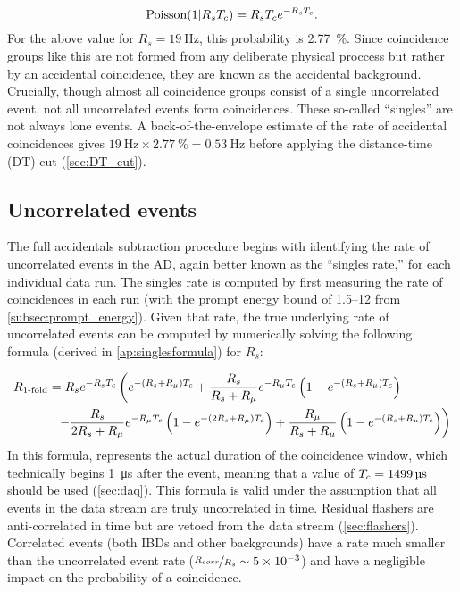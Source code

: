 \begin{equation}
    \text{Poisson}(1\vert R_sT_c) = R_sT_c e^{-R_sT_c}.
\end{equation}
For the above value for $R_s=\SI{19}{\hertz}$, this probability is \SI{2.77}{\percent}.
Since  coincidence groups like this are not formed from any
deliberate physical proccess but rather by an accidental coincidence,
they are known as the accidental background.
Crucially, though almost all  coincidence groups
consist of a single uncorrelated event,
not all uncorrelated events form  coincidences.
These so-called ``singles'' are not always lone events.
A back-of-the-envelope estimate of the rate of accidental coincidences gives
$\SI{19}{\hertz}\times\SI{2.77}{\percent}=\SI{0.53}{\hertz}$
before applying the distance-time (DT) cut (\cref{sec:DT_cut}).

\subsection{Uncorrelated events}
\label{subsec:singles}

The full accidentals subtraction procedure begins with identifying
the rate of uncorrelated events in the AD, again better known
as the ``singles rate,'' for each individual data run.
The singles rate is computed by first measuring the rate of
 coincidences in each run
(with the prompt energy bound of \SIrange{1.5}{12}{\mev} from \cref{subsec:prompt_energy}).
Given that rate, the true underlying rate of uncorrelated events can be
computed by numerically solving the following formula
(derived in \cref{ap:singlesformula}) for $R_s$:

\begin{align}
    \label{eq:rsingles}
    \begin{split}
        R_{\text{\fold{1}}}
          &= R_s e^{-R_s\tc}
          \left(
              e^{-(R_s + R_\mu)\tc} +
              \frac{R_s}{R_s+R_\mu} e^{-R_\mu\tc}
              \left(
                  1 - e^{-(R_s + R_\mu)\tc}
              \right)
          \right. \\
          &\ \ %
          \left. - \frac{R_s}{2R_s + R_\mu} e^{-R_\mu\tc}
              \left(
                  1 - e^{-(2R_s + R_\mu)\tc}
              \right) +
              \frac{R_\mu}{R_s + R_\mu}
              \left(
                  1 - e^{-(R_s + R_\mu)\tc}
              \right)
          \right)
    \end{split}
\end{align}
In this formula, \tc{} represents the actual duration of the coincidence window,
which technically begins \SI{1}{\micro\second} after the event,
meaning that a value of $T_c=\SI{1499}{\micro\second}$ should be used (\cref{sec:daq}).
This formula is valid under the assumption that all
events in the data stream are truly uncorrelated in time.
Residual flashers are anti-correlated in time
but are vetoed from the data stream (\cref{sec:flashers}).
Correlated events (both IBDs and other backgrounds)
have a rate much smaller than the uncorrelated event rate
($\nicefrac{R_{corr}}{R_s} \sim \num{5e-3}$)
and have a negligible impact on the probability of a  coincidence.

